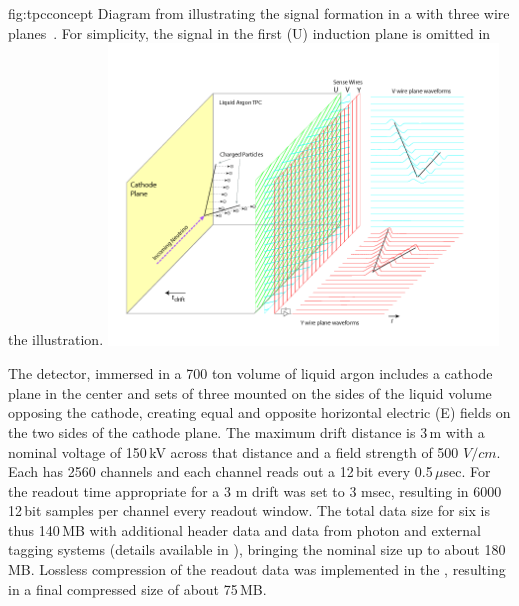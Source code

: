 \documentclass[../main-v1.tex]{subfiles}
\begin{document}
\begin{dunefigure}
{fig:tpcconcept} %
{Diagram  from    illustrating the signal formation in a  with three wire planes~\cite{Acciarri:2016smi}. For simplicity, the signal in the first (U) induction plane is omitted in the illustration. }
\includegraphics[trim={0cm 0.6cm 2.5cm 0.7cm},clip,height=8cm]{graphics/IntroFigures/Fig_04_LArTPC_Concept.png}
\end{dunefigure}

The  detector, immersed in a 700 ton volume of liquid argon includes %
a cathode plane in the center and sets of three  mounted on the %
sides of the liquid volume opposing the cathode, creating %
equal and opposite horizontal electric (E) fields on the two sides of the cathode plane. %
The maximum drift distance is  3\,m with a nominal voltage of 150\,kV  across that distance and a field strength of 500 $V/cm$.  Each  has 2560 channels and each channel reads out a 12\,bit  every 0.5\,$\mu$sec. %
For  the readout time appropriate for a 3 m drift was set to 3 msec,  resulting in 6000 12\,bit samples per channel every readout window. 
The total data size for six  is thus 140\,MB with additional header data and data from photon and external tagging systems (details available in \cite{DUNE:2021hwx}), bringing the nominal  size up to about 180\,MB.  Lossless compression of the  readout data was implemented in the , resulting in a final compressed  size of about 75\,MB. 
\end{document}
